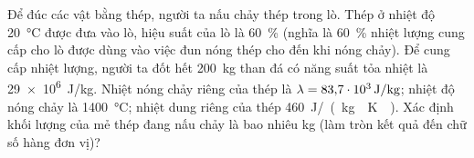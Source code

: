\begin{ex}
	Để đúc các vật bằng thép, người ta nấu chảy thép trong lò. Thép ở nhiệt độ \SI{20}{\celsius} được đưa vào lò, hiệu suất của lò là \SI{60}{\percent} (nghĩa là \SI{60}{\percent} nhiệt lượng cung cấp cho lò được dùng vào việc đun nóng thép cho đến khi nóng chảy). Để cung cấp nhiệt lượng, người ta đốt hết \SI{200}{\kilogram} than đá có năng suất tỏa nhiệt là \SI{29e6}{\joule/\kilogram}. Nhiệt nóng chảy riêng của thép là $\lambda=\SI{83.7E3}{\joule/\kilogram}$; nhiệt độ nóng chảy là \SI{1400}{\celsius}; nhiệt dung riêng của thép \SI{460}{\joule/\left(\kilogram\cdot\kelvin\right)}. Xác định khối lượng của mẻ thép đang nấu chảy là bao nhiêu kg (làm tròn kết quả đến chữ số hàng đơn vị)?
\end{ex}